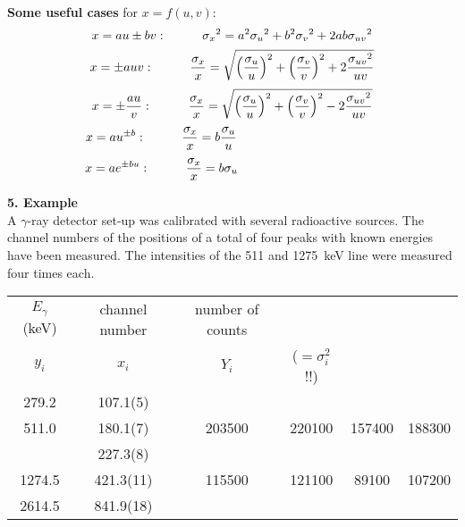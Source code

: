 \documentclass[12pt]{article}
\begin{document}
\pagebreak
{\bf Some useful cases} for $x=f(u,v)$:\\
\begin{displaymath}
x=au\pm bv: \hspace*{1cm}
{\sigma_x}^2=a^2{\sigma_u}^2+b^2{\sigma_v}^2+2ab{\sigma_{uv}}^2
\end{displaymath}
\begin{displaymath}
x=\pm auv: \hspace*{1cm}\frac{{\sigma_x}}{x}=\sqrt{
\left(\frac{{\sigma_u}}{u}\right)^2+\left(\frac{{\sigma_v}}{v}\right)^2+
2\frac{{\sigma_{uv}}^2}{uv}}
\end{displaymath}
\begin{displaymath}
x=\pm \frac{au}{v}: \hspace*{1cm}\frac{{\sigma_x}}{x}=\sqrt{
\left(\frac{{\sigma_u}}{u}\right)^2+\left(\frac{{\sigma_v}}{v}\right)^2-
2\frac{{\sigma_{uv}}^2}{uv}}
\end{displaymath}
\begin{displaymath}
x=au^{\pm b}: \hspace*{1cm}\frac{{\sigma_x}}{x}=b\frac{{\sigma_u}}{u}
\hspace*{4cm}
\end{displaymath}
\begin{displaymath}
x=ae^{\pm bu}: \hspace*{1cm}\frac{{\sigma_x}}{x}=b\sigma_u\hspace*{4cm}
\end{displaymath}
\vspace*{1cm}

{\large\bf 5. Example}\\
A $\gamma$-ray detector set-up was calibrated with several radioactive
sources. The channel numbers of the positions of a total of four peaks
with known energies have been measured. The intensities of the 511 and
1275~keV line were measured four times each.\\

\begin{tabular}{cccccc}
$E_{\gamma}$ (keV) & channel number & number of counts\\
$y_i$&$x_i$&$Y_i$ & ($=\sigma_i^2$!!)\\
\hline
 279.2 & 107.1(5) \\
 511.0 & 180.1(7) & 203500 & 220100 & 157400 & 188300 \\
       & 227.3(8) \\
1274.5 & 421.3(11) & 115500 & 121100 &  89100 & 107200 \\
2614.5 & 841.9(18) \\
\hline
\end{tabular}
\vspace*{4mm}
\end{document}
